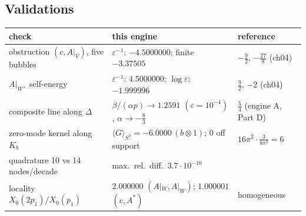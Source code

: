 \documentclass[10pt]{article}
\begin{document}
\subsection*{Validations}
{\small
\begin{tabular}{lll}
\toprule
check & this engine & reference\\
\midrule
obstruction $(c,A|_V)$, five bubbles & $\varepsilon^{-1}$: $-4.5000000$; finite $-3.37505$ & $-\tfrac92$, $-\tfrac{27}8$ (ch04)\\
$A|_{W^\perp}$ self-energy & $\varepsilon^{-1}$: $4.5000000$; $\log\varepsilon$: $-1.999996$ & $\tfrac92$, $-2$ (ch04)\\
composite line along $\Delta$ & $\beta/(\alpha p)\to1.2591$ $(\varepsilon=10^{-4})$, $\alpha\to-\tfrac83$ & $\tfrac54$ (engine A, Part D)\\
zero-mode kernel along $K_b$ & $\langle G\rangle_{S^3}=-6.0000\,(b\otimes1)$; $0$ off support & $16\pi^2\cdot\tfrac3{8\pi^2}=6$\\
quadrature 10 vs 14 nodes/decade & max.\ rel.\ diff.\ $3.7\cdot10^{-10}$ & \\
locality $X_0(2p_1)/X_0(p_1)$ & $2.000000$ $(A|_W,A|_W)$; $1.000001$ $(c,A^*)$ & homogeneous\\
\bottomrule
\end{tabular}}
\end{document}
